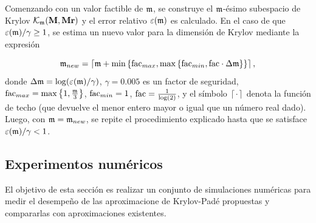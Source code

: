 \begin{sloppypar}
	Comenzando con un valor factible de $\mathfrak{m}$, se construye el $\mathfrak{m}$-ésimo subespacio de Krylov $\mathcal{K}_{\mathfrak{m}}(\mathbf{M},\mathbf{Mr})$ y el error relativo $\varepsilon(\mathfrak{m})$ es calculado. En el caso de que $\varepsilon(\mathfrak{m})/\gamma \geq 1$, se estima un nuevo valor para la dimensión de Krylov mediante la expresión
\end{sloppypar}
\begin{equation*}
\mathfrak{m}_{new} = \left\lceil \mathfrak{m} + \min\left\{ \mathrm{fac}_{max} , \max\left\{ \mathrm{fac}_{min},
		\mathrm{fac}\cdot\Delta\mathfrak{m} \right\}  \right\} \right\rceil,
\end{equation*}
donde $\Delta\mathfrak{m}=\log(\varepsilon(\mathfrak{m})/\gamma)$, $\gamma=0.005$ es un factor de seguridad, $\mathrm{fac}_{max}= \max\left\{  1, \frac{\mathfrak{m}}{3}  \right\}$, $\mathrm{fac}_{min}= 1 $, $\mathrm{fac}=\frac{1}{\log(2)}$, y el símbolo $\left\lceil \cdot \right\rceil$ denota la función de techo (que devuelve el menor entero mayor o igual que un número real dado). Luego, con $\mathfrak{m}=\mathfrak{m}_{new}$, se repite el procedimiento explicado hasta que se satisface $\varepsilon(\mathfrak{m})/\gamma< 1$.

\subsection{Experimentos numéricos}\label{section:num-sim-kp}
El objetivo de esta sección es realizar un conjunto de simulaciones numéricas para medir el desempeño de las aproximacione de Krylov-Padé  propuestas y compararlas con aproximaciones existentes.


